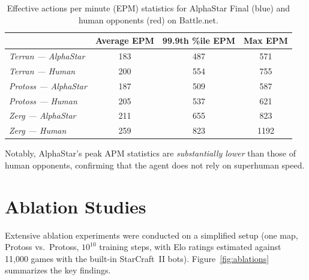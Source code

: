 \documentclass[11pt,a4paper]{article}
\begin{document}
\begin{table}[H]
\centering
\caption{Effective actions per minute (EPM) statistics for AlphaStar Final (blue) and human opponents (red) on Battle.net.}
\label{tab:apm}
\begin{tabular}{@{}lccc@{}}
\toprule
& \textbf{Average EPM} & \textbf{99.9th \%ile EPM} & \textbf{Max EPM} \\
\midrule
\textit{Terran --- AlphaStar} & 183 & 487 & 571 \\
\textit{Terran --- Human} & 200 & 554 & 755 \\
\midrule
\textit{Protoss --- AlphaStar} & 187 & 509 & 587 \\
\textit{Protoss --- Human} & 205 & 537 & 621 \\
\midrule
\textit{Zerg --- AlphaStar} & 211 & 655 & 823 \\
\textit{Zerg --- Human} & 259 & 823 & 1192 \\
\bottomrule
\end{tabular}
\end{table}

Notably, AlphaStar's peak APM statistics are \emph{substantially lower} than those of human opponents, confirming that the agent does not rely on superhuman speed.

\section{Ablation Studies}

Extensive ablation experiments were conducted on a simplified setup (one map, Protoss vs.\ Protoss, $10^{10}$ training steps, with Elo ratings estimated against 11,000 games with the built-in StarCraft~II bots). Figure~\ref{fig:ablations} summarizes the key findings.
\end{document}
